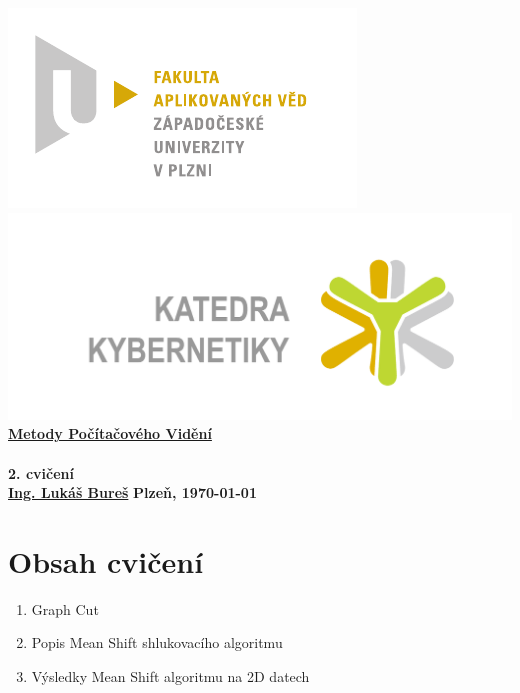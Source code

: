 \documentclass[12pt, a4paper]{article}
\newcommand{\cisloCviceni}{2. cvičení}
\begin{document}
 









 
\begin{titlepage}
\begin{center}
	\includegraphics[trim = 0.6cm 0.5cm 0.9cm 0.5cm, scale=1]{./FAV_logo_cz.pdf}
	\hspace*{\fill}
	\includegraphics[trim = 3.5cm 1.5cm 2.6cm 2cm, scale=0.295]{./KKY_logo_cz.pdf}\\
	\vspace*{\fill}
	\textbf{\Huge{\href{http://www.kky.zcu.cz/cs/courses/mpv}{Metody Počítačového Vidění} \\ ~ \\ \cisloCviceni}}\\
	\vspace*{\fill}
	\textbf{\large{\href{mailto:LBures@kky.zcu.cz}{Ing. Lukáš Bureš}}} \hfill \textbf{\large{Plzeň, \today}}
\end{center}
\end{titlepage}












\section*{Obsah cvičení}
\begin{enumerate}
	\item Graph Cut
	\item Popis Mean Shift shlukovacího algoritmu
	\item Výsledky Mean Shift algoritmu na 2D datech
\end{enumerate}
\end{document}
